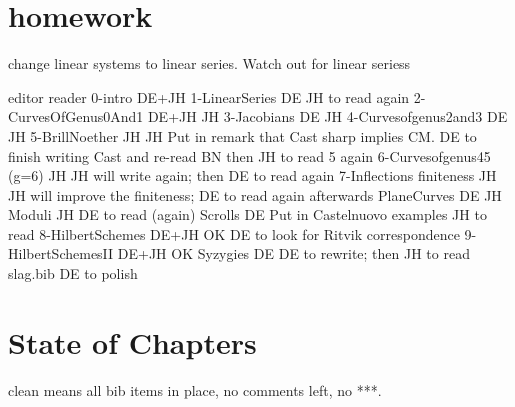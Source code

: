 \documentclass[12pt, leqno]{book}
\begin{document}
\section{homework}

change linear systems to linear series. Watch out for linear seriess

						editor	reader
{0-intro}					DE+JH	
{1-LinearSeries} 					DE JH to read again
{2-CurvesOfGenus0And1}		DE+JH	JH		
{3-Jacobians}				DE		JH
{4-Curvesofgenus2and3}		DE		JH
{5-BrillNoether}				JH		JH  Put in remark that Cast sharp implies CM. DE to finish writing Cast and re-read BN then JH to read 5 again
{6-Curvesofgenus45}		(g=6)	JH JH will write again; then DE to read again
{7-Inflections} 				finiteness	JH JH will improve the finiteness; DE to read again afterwards
{PlaneCurves}				DE		JH
{Moduli}							JH  DE to read (again)
{Scrolls}							DE Put in Castelnuovo examples JH to read
{8-HilbertSchemes}			DE+JH		OK  DE to look for Ritvik correspondence
{9-HilbertSchemesII}			DE+JH		OK
{Syzygies}					DE			DE to rewrite; then JH to read
slag.bib								DE to polish



\section{State of Chapters}
clean means all bib items in place, no \fix comments left, no ***.
\end{document}
